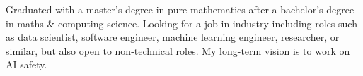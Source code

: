 Graduated with a master's degree in pure mathematics after a bachelor's degree in maths \& computing science.
Looking for a job in industry including roles such as data scientist, software engineer, machine learning engineer, researcher, or similar,
but also open to non-technical roles.
My long-term vision is to work on AI safety.
